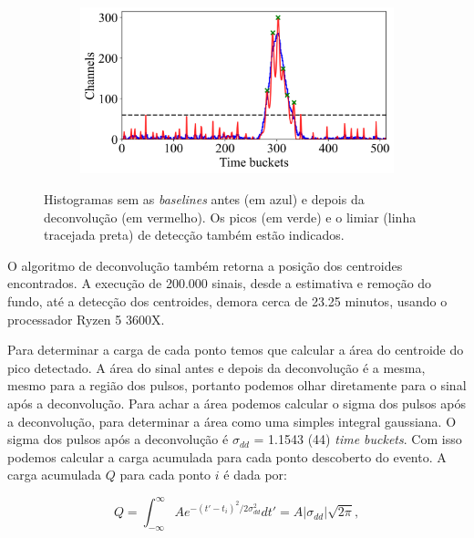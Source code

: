 \documentclass[a4paper,12pt,oneside]{book}
\begin{document}
\begin{figure}[H]
\begin{subfigure}[b]{0.48\textwidth}
        \caption{}
        \label{subfig:ex_sinal_deconv_3}
    \end{subfigure}%
    \hfill
    \begin{subfigure}[b]{0.48\textwidth}
        \centering
        \includegraphics[scale=0.40]{figs/ex_deconv_4.png}
        \caption{}
        \label{subfig:ex_sinal_deconv_4}
    \end{subfigure}
\caption{Histogramas sem as \textit{baselines} antes (em azul) e depois da deconvolução (em vermelho). Os picos (em verde) e o limiar (linha tracejada preta) de detecção também estão indicados.}
\label{fig:ex_sinal_deconv}
\end{figure}

\par O algoritmo de deconvolução também retorna a posição dos centroides encontrados. A execução de 200.000 sinais, desde a estimativa e remoção do fundo, até a detecção dos centroides, demora cerca de 23.25 minutos, usando o processador Ryzen 5 3600X.

\par Para determinar a carga de cada ponto temos que calcular a área do centroide do pico detectado. A área do sinal antes e depois da deconvolução é a mesma, mesmo para a região dos pulsos, portanto podemos olhar diretamente para o sinal após a deconvolução. Para achar a área podemos calcular o sigma dos pulsos após a deconvolução, para determinar a área como uma simples integral gaussiana. O sigma dos pulsos após a deconvolução é $\sigma_{dd}$ = 1.1543 (44) \textit{time buckets}. Com isso podemos calcular a carga acumulada para cada ponto descoberto do evento. A carga acumulada $Q$ para cada ponto $i$ é dada por:

\begin{equation}\label{eq:gauss_area}
    Q = \int^\infty _{-\infty} Ae^{-(t' - t_i)^2 / 2\sigma_{dd}^2} dt' = A\left |\sigma_{dd} \right|\sqrt{2\pi},
\end{equation}
\end{document}
